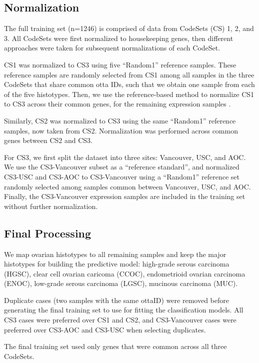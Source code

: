 \documentclass[
]{report}
\begin{document}
\subsection{Normalization}\label{normalization}

The full training set (n=1246) is comprised of data from CodeSets (CS) 1, 2, and 3. All CodeSets were first normalized to housekeeping genes, then different approaches were taken for subsequent normalizations of each CodeSet.

CS1 was normalized to CS3 using five ``Random1'' reference samples. These reference samples are randomly selected from CS1 among all samples in the three CodeSets that share common otta IDs, such that we obtain one sample from each of the five histotypes. Then, we use the reference-based method to normalize CS1 to CS3 across their common genes, for the remaining expression samples \citet{talhouk2016}.

Similarly, CS2 was normalized to CS3 using the same ``Random1'' reference samples, now taken from CS2. Normalization was performed across common genes between CS2 and CS3.

For CS3, we first split the dataset into three sites: Vancouver, USC, and AOC. We use the CS3-Vancouver subset as a ``reference standard'', and normalized CS3-USC and CS3-AOC to CS3-Vancouver using a ``Random1'' reference set randomly selected among samples common between Vancouver, USC, and AOC. Finally, the CS3-Vancouver expression samples are included in the training set without further normalization.

\subsection{Final Processing}\label{final-processing}

We map ovarian histotypes to all remaining samples and keep the major histotypes for building the predictive model: high-grade serous carcinoma (HGSC), clear cell ovarian caricoma (CCOC), endometrioid ovarian carcinoma (ENOC), low-grade serous carcinoma (LGSC), mucinous carcinoma (MUC).

Duplicate cases (two samples with the same ottaID) were removed before generating the final training set to use for fitting the classification models. All CS3 cases were preferred over CS1 and CS2, and CS3-Vancouver cases were preferred over CS3-AOC and CS3-USC when selecting duplicates.

The final training set used only genes that were common across all three CodeSets.
\end{document}
